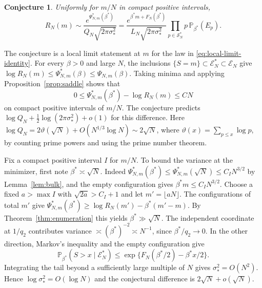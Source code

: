 \documentclass[11pt]{amsart}
\newtheorem{conjecture}[theorem]{Conjecture}
\theoremstyle{remark}
\newcommand{\Pp}{\mathbb P}
\begin{document}
\begin{conjecture}\label{conj:local-limit}
Uniformly for \(m/N\) in compact positive intervals,
\begin{equation}\label{eq:local-limit-conjecture}
 R_N(m)\sim
 \frac{e^{\Psi_{N,m}^\ast(\beta^\ast)}}{Q_N\sqrt{2\pi\sigma_\ast^2}}
 =\frac{e^{\beta^\ast m+F_N(\beta^\ast)}}{L_N\sqrt{2\pi\sigma_\ast^2}}
   \prod_{p\in\mathcal S_N^\ast}p\,\Pp_{\beta^\ast}(E_p).
\end{equation}
\end{conjecture}

The conjecture is a local limit statement at \(m\) for the law
in \eqref{eq:local-limit-identity}. For every \(\beta>0\) and large \(N\),
the inclusions \(\{S=m\}\subset\mathcal E_N^\ast\subset\mathcal E_N\)
give \(\log R_N(m)\le\Psi_{N,m}^\ast(\beta)\le\Psi_{N,m}(\beta)\).
Taking minima and applying Proposition~\ref{prop:saddle} shows that
\[
 0\le\Psi_{N,m}^\ast(\beta^\ast)-\log R_N(m)\le CN
\]
on compact positive intervals of \(m/N\). The conjecture predicts
\(\log Q_N+\tfrac12\log(2\pi\sigma_\ast^2)+o(1)\) for this difference.
Here \(\log Q_N=2\vartheta(\sqrt N)+O(N^{1/3}\log N)\sim2\sqrt N\),
where \(\vartheta(x)=\sum_{p\le x}\log p\), by counting prime powers
and using the prime number theorem.

Fix a compact positive interval \(I\) for \(m/N\). To bound the variance
at the minimizer, first note \(\beta^\ast\asymp\sqrt N\). Indeed
\(\Psi_{N,m}^\ast(\beta^\ast)\le\Psi_{N,m}^\ast(\sqrt N)\le C_I N^{3/2}\)
by Lemma~\ref{lem:bulk}, and the empty configuration gives
\(\beta^\ast m\le C_I N^{3/2}\).
Choose a fixed \(a>\max I\) with \(\sqrt{2a}>C_I+1\) and let
\(m'=\lfloor aN\rfloor\). The configurations of total \(m'\) give
\(\Psi_{N,m}^\ast(\beta^\ast)\ge\log R_N(m')-\beta^\ast(m'-m)\).
By Theorem~\ref{thm:enumeration} this yields \(\beta^\ast\gg\sqrt N\).
The independent coordinate at \(1/q_2\) contributes variance
\(\asymp(\beta^\ast)^{-2}\asymp N^{-1}\), since \(\beta^\ast/q_2\to0\). In the other direction, Markov's
inequality and the empty configuration give
\[
 \Pp_{\beta^\ast}(S>x\mid\mathcal E_N^\ast)
 \le \exp\{F_N(\beta^\ast/2)-\beta^\ast x/2\}.
\]
Integrating the tail beyond a sufficiently large multiple of \(N\)
gives \(\sigma_\ast^2=O(N^2)\). Hence \(\log\sigma_\ast^2=O(\log N)\)
and the conjectural difference is \(2\sqrt N+o(\sqrt N)\).
\end{document}
